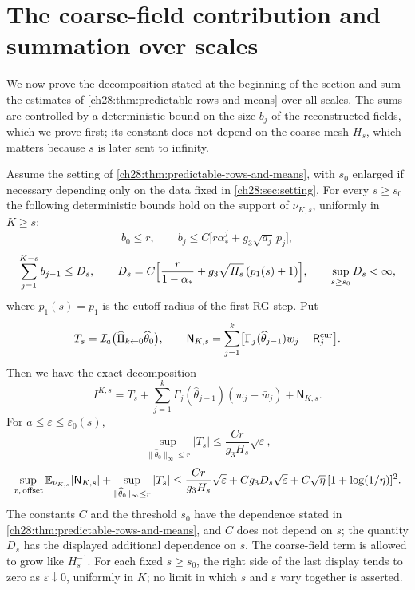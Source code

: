 \section{The coarse-field contribution and summation over scales}\label{ch28:sec:scales}

We now prove the decomposition stated at the beginning of the section and sum the estimates of \cref{ch28:thm:predictable-rows-and-means} over all scales. The sums are controlled by a deterministic bound on the size $b_j$ of the reconstructed fields, which we prove first; its constant does not depend on the coarse mesh $H_s$, which matters because $s$ is later sent to infinity.

\begin{lemma}\label{ch28:lem:top-current-and-caps}
Assume the setting of \cref{ch28:thm:predictable-rows-and-means}, with $s_0$ enlarged if necessary depending only on the data fixed in \cref{ch28:sec:setting}. For every $s\ge s_0$ the following deterministic bounds hold on the support of $\nu_{K,s}$, uniformly in $K\ge s$:
\[
 b_0\le r,\qquad b_j\le C\bigl[r\alpha_*^j+g_3\sqrt{a_j}\,p_j\bigr],
\]
\[
 \sum_{j=1}^{K-s}b_{j-1}\le D_s,\qquad D_s=C\Bigl[\frac r{1-\alpha_*}+g_3\sqrt{H_s}\,(p_1(s)+1)\Bigr],\qquad \sup_{s\ge s_0}D_s<\infty,
\]
where $p_1(s)=p_1$ is the cutoff radius of the first RG step. Put
\[
 T_s=\mathcal I_a\bigl(\widehat\Pi_{k\leftarrow0}\widehat\theta_0\bigr),\qquad \mathsf N_{K,s}=\sum_{j=1}^k\bigl[\Gamma_j(\widehat\theta_{j-1})\bar w_j+\mathsf R_j^{\rm cur}\bigr].
\]
Then we have the exact decomposition
\[
 I^{K,s}=T_s+\sum_{j=1}^k\Gamma_j(\widehat\theta_{j-1})(w_j-\bar w_j)+\mathsf N_{K,s}.
\]
For $a\le\varepsilon\le\varepsilon_0(s)$,
\[
 \sup_{\|\widehat\theta_0\|_\infty\le r}|T_s|\le\frac{Cr}{g_3H_s}\sqrt\varepsilon,
\]
\[
 \sup_{x,\,\text{offset}}\mathbb E_{\nu_{K,s}}|\mathsf N_{K,s}|+\sup_{\|\widehat\theta_0\|_\infty\le r}|T_s|\le\frac{Cr}{g_3H_s}\sqrt\varepsilon+Cg_3D_s\sqrt\varepsilon+C\sqrt\eta\,[1+\log(1/\eta)]^2.
\]
The constants $C$ and the threshold $s_0$ have the dependence stated in \cref{ch28:thm:predictable-rows-and-means}, and $C$ does not depend on $s$; the quantity $D_s$ has the displayed additional dependence on $s$. The coarse-field term is allowed to grow like $H_s^{-1}$. For each fixed $s\ge s_0$, the right side of the last display tends to zero as $\varepsilon\downarrow0$, uniformly in $K$; no limit in which $s$ and $\varepsilon$ vary together is asserted.
\end{lemma}

